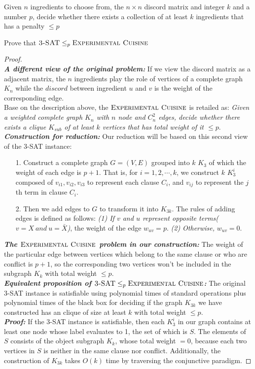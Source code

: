 \documentclass[12pt,a4paper]{article}
\theoremstyle{definition}
\begin{document}
\begin{enumerate}
        Given $n$ ingredients to choose from, the $n\times n$ discord matrix and integer $k$ and a number $p$,  decide whether there exists a collection of at least $k$ ingredients that has a penalty $\leqslant p$

    Prove that $\textsc{3-SAT}\leq_p\textsc{Experimental Cuisine}$
    \begin{proof}
    ~\\
    \textbf{\textit{A different view of the original problem:}} If we view the discord matrix as a adjacent matrix, the $n$ ingredients play the role of vertices of a complete graph $K_n$ while the $discord$ between ingredient $u$ and $v$ is the weight of the corresponding edge.
    \\
    Base on the description above, the $\textsc{Experimental Cuisine}$ is retailed as: \textit{Given a weighted complete graph $K_n$ with $n$ node and $C_n^2$ edges, decide whether there exists a clique $K_{sub}$ of at least $k$ vertices that has total weight of it $\leq p$}.
    \\
    \textbf{\textit{Construction for reduction:}}
    Our reduction will be based on this second view of the 3-SAT instance:
    \begin{enumerate}
    \item [1.] Construct a complete graph $G=(V,E)$ grouped into $k$ $K_3$ of which the weight of each edge is $p+1$. That is, for $i=1,2,\cdots,k$, we construct $k$ $K_3^i$ composed of $v_{i1},v_{i2},v_{i3}$ to represent each clause $C_i$, and $v_{ij}$ to represent the $j$th term in clause $C_i$.
    \item [2.] Then we add edges to $G$ to transform it into $K_{3k}$. The rules of adding edges is defined as follows: \textit{(1) If $v$ and $u$ represent opposite terms($v=X\ and\ u=\bar{X}$)}, the weight of the edge $w_{uv}=p$. \textit{(2) Otherwise,} $w_{uv}=0$.
    \end{enumerate}
    \textit{\textbf{The $\textsc{Experimental Cuisine}$ problem in our construction:}} The weight of the particular edge between vertices which belong to the same clause or who are conflict is $p+1$, so the corresponding two vertices won't be included in the subgraph $K_k$ with total weight $\leq p$.
    \\
    \textbf{\textit{Equivalent proposition of $\textsc{3-SAT}\leq_p\textsc{Experimental Cuisine}$:}}
    The original 3-SAT instance is satisfiable using polynomial times of standard operations plus polynomial times of the black box for deciding if the graph $K_{3k}$ we have constructed has an clique of size at least $k$ with total weight $\leq p$. 
\\
	\textbf{\textit{Proof:}} If the 3-SAT instance is satisfiable, then each $K_3^i$ in our graph contains at least one node whose label evaluates to 1, the set of which is $S$. The elements of $S$ consists of the object subgraph $K_k$, whose total weight $=0$, because each two vertices in $S$ is neither in the same clause nor conflict. Additionally, the construction of $K_{3k}$ takes $O(k)$ time by traversing the conjunctive paradigm.
	

\end{proof}
\end{enumerate}
\end{document}

